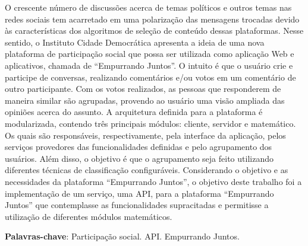 \begin{resumo}
O crescente número de discussões acerca de temas políticos e outros temas nas redes sociais tem acarretado em uma polarização 
das mensagens trocadas devido às características dos algoritmos de seleção de conteúdo dessas plataformas. 
Nesse sentido, o Instituto Cidade Democrática apresenta a ideia de uma nova plataforma de participação social
que possa ser utilizada como aplicação Web e aplicativos, chamada de ``Empurrando Juntos''. 
O intuito é que o usuário crie e participe de conversas, realizando comentários e/ou votos em um comentário de outro participante. 
Com os votos realizados, as pessoas que responderem de maneira similar são agrupadas, 
provendo ao usuário uma visão ampliada das opiniões acerca do assunto. 
A arquitetura definida para a plataforma é modularizada, contendo três principais módulos: cliente, servidor e matemático.
Os quais são responsáveis, respectivamente, pela interface da aplicação, pelos serviços provedores das funcionalidades definidas 
e pelo agrupamento dos usuários. Além disso, o objetivo é que o agrupamento seja feito utilizando 
diferentes técnicas de classificação configuráveis.
Considerando o objetivo e as necessidades da plataforma ``Empurrando Juntos'', 
o objetivo deste trabalho foi a implementação de um serviço, uma API, 
para a plataforma ``Empurrando Juntos'' que contemplasse as funcionalidades supracitadas e permitisse a utilização de diferentes
módulos matemáticos. 
\vspace{\onelineskip}
  
\noindent
\textbf{Palavras-chave}: Participação social. API. Empurrando Juntos.
\end{resumo}
